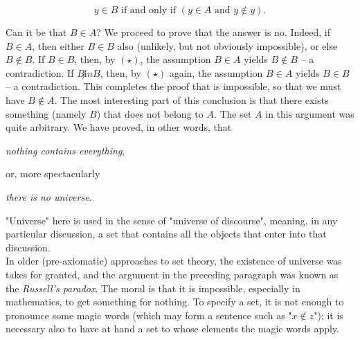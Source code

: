 \begin{equation}
	y \in B \text{ if and only if } (y \in A \text{ and } y \not \in y). \tag{$\star$}
\end{equation}

Can it be that $B \in A$? We proceed to prove that the answer is no. Indeed, if $B \in A$, then either $B \in B$ also (unlikely, but not obviously impossible), or else $B \not \in B$. If $B \in B$, then, by $(\star)$, the assumption $B \in A$ yields $B \not \in B$ -- a contradiction. If $B \not in B$, then, by $(\star)$ again, the assumption $B \in A$ yields $B \in B$ -- a contradiction. This completes the proof that is impossible, so that we must have $B \not \in A$. The most interesting part of this conclusion is that there exists something (namely $B$) that does not belong to $A$. The set $A$ in this argument was quite arbitrary. We have proved, in other words, that
\begin{center}
	\textit{nothing contains everything},
\end{center}
or, more spectacularly
\begin{center}
	\textit{there is no universe}.
\end{center}
"Universe" here is used in the sense of "universe of discourse", meaning, in any particular discussion, a set that contains all the objects that enter into that discussion.\\

In older (pre-axiomatic) approaches to set theory, the existence of universe was takes for granted, and the argument in the preceding paragraph was known as the \textit{Russell's paradox}. The moral is that it is impossible, especially in mathematics, to get something for nothing. To specify a set, it is not enough to pronounce some magic words (which may form a sentence such as "$x \not \in z$"); it is necessary also to have at hand a set to whose elements the magic words apply.